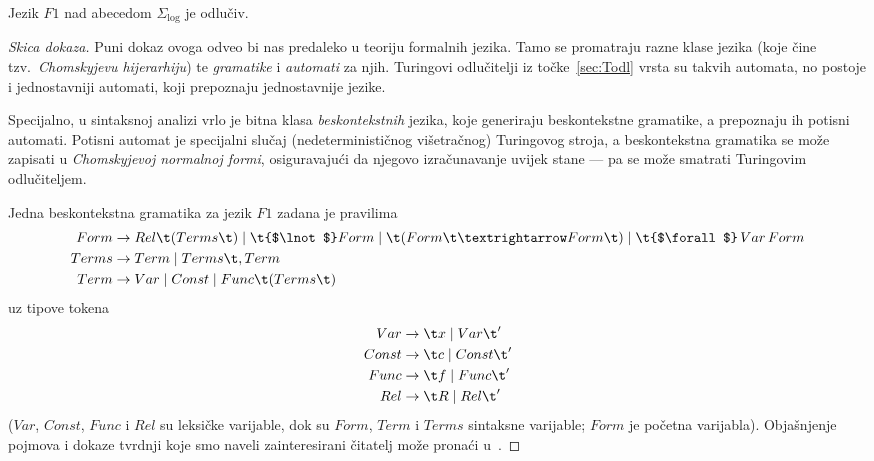 
\begin{propozicija}[{name=[odlučivost jezika svih formula prvog reda]}]\label{pp:F1odl}
    Jezik $F1$ nad abecedom $\Sigma_{\log}$ je odlučiv.
\end{propozicija}
\begin{proof}[Skica dokaza] Puni dokaz ovoga odveo bi nas predaleko u teoriju formalnih jezika. Tamo se promatraju razne klase jezika (koje čine tzv.\ \emph{Chomskyjevu hijerarhiju}) te \emph{gramatike} i \emph{automati} za njih. Turingovi odlučitelji iz točke~\ref{sec:Todl} vrsta su takvih automata, no postoje i jednostavniji automati, koji prepoznaju jednostavnije jezike.

Specijalno, u sintaksnoj analizi vrlo je bitna klasa \emph{beskontekstnih} jezika, koje generiraju beskontekstne gramatike, a prepoznaju ih potisni automati. Potisni automat je specijalni slučaj (nedeterminističnog višetračnog) Turingovog stroja, a beskontekstna gramatika se može zapisati u \emph{Chomskyjevoj normalnoj formi}, osiguravajući da njegovo izračunavanje uvijek stane --- pa se može smatrati Turingovim odlučiteljem.

Jedna beskontekstna gramatika za jezik $F1$ zadana je pravilima
\begin{align}
    Form&\to Rel\t(Terms\t)\mid\t{$\lnot$} Form\mid\t(Form\t\textrightarrow Form\t)\mid\t{$\forall$}\,Var\,Form\\
    Terms&\to Term\mid Terms\t,Term\\
    Term&\to Var\mid Const\mid Func\t(Terms\t)
\end{align}
uz tipove tokena
    \begin{align}
    Var&\to\t x\mid Var\t'\\
    Const&\to\t c\mid Const\t'\\
    Func&\to\t f\mid Func\t'\\
    Rel&\to\t R\mid Rel\t'
\end{align}
($Var$, $Const$, $Func$ i $Rel$ su leksičke varijable, dok su $Form$, $Term$ i $Terms$ sintaksne varijable; $Form$ je početna varijabla). Objašnjenje pojmova i dokaze tvrdnji koje smo naveli zainteresirani čitatelj može pronaći u~\cite{sipser}.
\end{proof}

